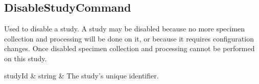 \subsection*{DisableStudyCommand}

Used to disable a study. A study may be disabled because no more specimen
collection and processing will be done on it, or because it requires
configuration changes. Once disabled specimen collection and processing cannot
be performed on this study.

\begin{commandparmtable}

  studyId & string & The study's unique identifier.\\

\end{commandparmtable}







